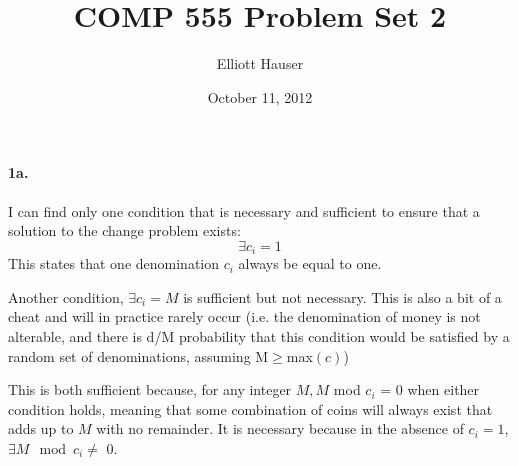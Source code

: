 \documentclass[12pt]{amsart}
\title{COMP 555 Problem Set 2}
\author{Elliott Hauser}
\date{October 11, 2012}
\begin{document}
\maketitle
\section{}
\paragraph{1a.}  I can find only one condition that is necessary and sufficient to ensure that a solution to the change problem exists:
\begin{equation*}
\exists c_i = 1
\end{equation*}
This states that one denomination $c_i$ always be equal to one.\begin{footnote}{Another condition, $\exists c_i = M$ is sufficient but not necessary.  This is also a bit of a cheat and will in practice rarely occur (i.e. the denomination of money is not alterable, and there is d/M probability that this condition would be satisfied by a random set of denominations, assuming M$\geq$max$(c)$)}\end{footnote}  This is both sufficient because, for any integer $M, M$ mod $c_i$ = 0 when either condition holds, meaning that some combination of coins will always exist that adds up to $M$ with no remainder.  It is necessary because in the absence of $c_i=1$, $\exists M \mod c_i \neq$  0.\\
\end{document}
